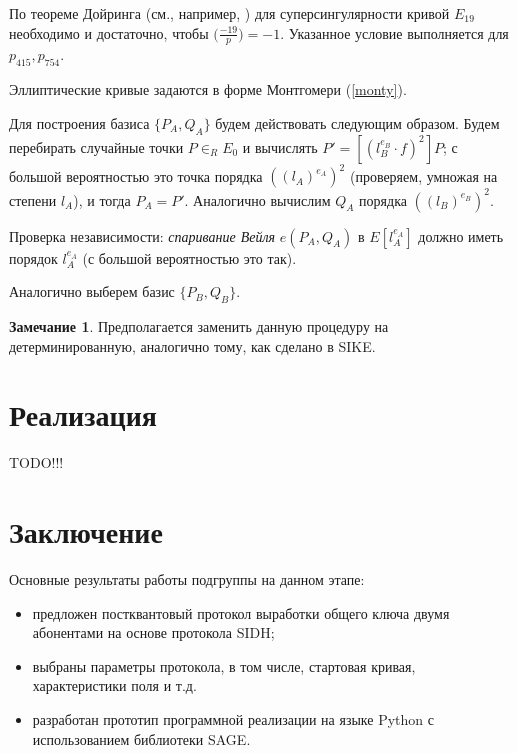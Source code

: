 \documentclass[a4paper,12pt]{article}
\theoremstyle{definition}
\newtheorem{remark}{Замечание}
\begin{document}
По теореме Дойринга (см., например, \cite[Теорема 2.1]{broker}) для суперсингулярности кривой $E_{19}$ необходимо и достаточно, чтобы $\big(\frac{-19}{p}\big) = -1$. %
Указанное условие выполняется для $p_{415}, p_{754}$.

Эллиптические кривые задаются   в форме Монтгомери (\ref{monty}).

Для построения базиса $\{P_A,Q_A\}$ будем действовать следующим образом.
Будем перебирать случайные точки   $P\in_R E_0$ и вычислять $P'=[(l_B ^{e_B}\cdot f)^2]P$; с большой вероятностью это точка порядка $((l_A)^{e_A})^2$ (проверяем, умножая на степени $l_A$), и тогда
 $P_A=P'$.
 Аналогично вычислим $Q_A$ порядка $((l_B)^{e_B})^2$. 
 
 Проверка независимости: \emph{спаривание Вейля} $e(P_A,Q_A)$ в $E[l_A^{e_A}]$ должно иметь порядок $l_A^{e_A}$ (с большой вероятностью это так).
 
Аналогично выберем базис $\{P_B,Q_B\}$.

\begin{remark}
 Предполагается заменить данную процедуру на детерминированную, аналогично тому, как сделано в SIKE.
\end{remark}





\section{Реализация}

TODO!!!

\section*{Заключение}

Основные результаты работы подгруппы на данном этапе:

\begin{itemize}
 \item  предложен постквантовый протокол выработки общего ключа двумя абонентами на основе протокола SIDH;

 \item  выбраны параметры протокола, в том числе, стартовая кривая, характеристики поля и т.д.

 \item  разработан прототип программной реализации на языке Python с использованием библиотеки SAGE.
\end{itemize}
\end{document}
